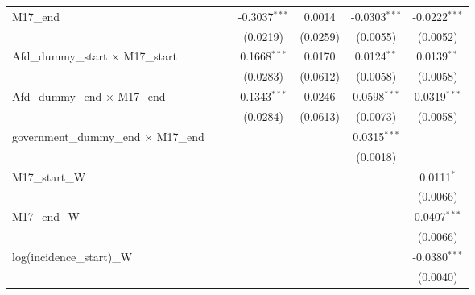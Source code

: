 \documentclass[10pt,a4paper]{article}
\begin{document}
\begin{tabular}{lcccccc}
   M17\_end                                     &                &                & -0.3037$^{***}$ & 0.0014         & -0.0303$^{***}$ & -0.0222$^{***}$\\   
                                                &                &                & (0.0219)        & (0.0259)       & (0.0055)        & (0.0052)\\   
   Afd\_dummy\_start $\times$ M17\_start        &                &                & 0.1668$^{***}$  & 0.0170         & 0.0124$^{**}$   & 0.0139$^{**}$\\   
                                                &                &                & (0.0283)        & (0.0612)       & (0.0058)        & (0.0058)\\   
   Afd\_dummy\_end $\times$ M17\_end            &                &                & 0.1343$^{***}$  & 0.0246         & 0.0598$^{***}$  & 0.0319$^{***}$\\   
                                                &                &                & (0.0284)        & (0.0613)       & (0.0073)        & (0.0058)\\   
   government\_dummy\_end $\times$ M17\_end     &                &                &                 &                & 0.0315$^{***}$  &   \\   
                                                &                &                &                 &                & (0.0018)        &   \\   
   M17\_start\_W                                &                &                &                 &                &                 & 0.0111$^{*}$\\   
                                                &                &                &                 &                &                 & (0.0066)\\   
   M17\_end\_W                                  &                &                &                 &                &                 & 0.0407$^{***}$\\   
                                                &                &                &                 &                &                 & (0.0066)\\   
   log(incidence\_start)\_W                     &                &                &                 &                &                 & -0.0380$^{***}$\\   
                                                &                &                &                 &                &                 & (0.0040)\\   

\end{tabular}
\end{document}
